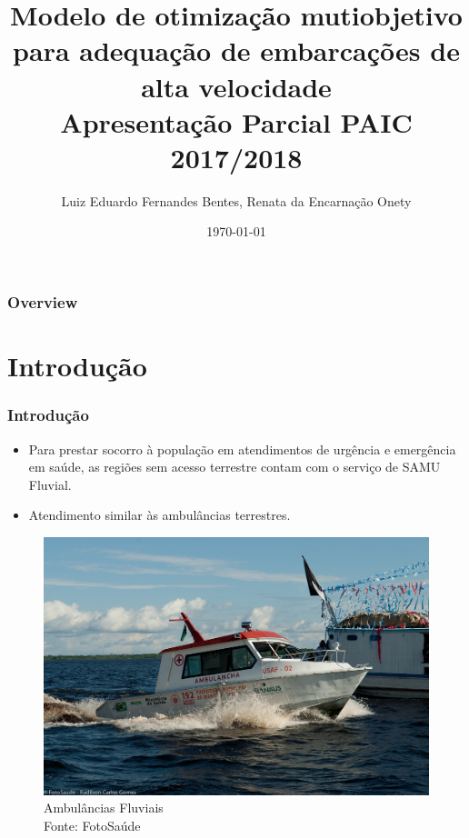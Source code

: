 \documentclass{beamer}
\title[ ]{\textbf{Modelo de otimização mutiobjetivo para adequação de embarcações de alta velocidade}\\[0.5cm]Apresentação Parcial PAIC 2017/2018} %
\author[L.E.F.B]{Luiz Eduardo Fernandes Bentes, Renata da Encarnação Onety} %
\institute[UEA] %
{
Universidade do Estado do Amazonas \\ Escola Superior de Tecnologia -- EST\\ Manaus - Amazonas - Brasil\\ %
\medskip
\textit{\{lefb.eng,ronety\} @uea.edu.br} %
}
\date{\today} %
\begin{document}
\begin{frame}
\titlepage %
\end{frame}

\begin{frame}
\frametitle{Overview}
\tableofcontents
\end{frame}

\section{Introdução} 
\begin{frame}
 \tableofcontents[ 
    currentsubsection, 
    hideothersubsections, 
    sectionstyle=show/shaded
    ] 
\end{frame}
\begin{frame}
\frametitle{Introdução}
\begin{itemize}
	\item Para prestar socorro à população em atendimentos de urgência e emergência em saúde, as regiões sem acesso terrestre contam com o serviço de SAMU Fluvial.
	\item Atendimento similar às ambulâncias terrestres.
\end{itemize}

\begin{figure}[h]
	\centering
	\includegraphics[scale=0.7]{samu17}
	\caption{Ambulâncias Fluviais\\Fonte: FotoSaúde}
	\label{fig:ambulancha}
\end{figure}

\end{frame}
\end{document}
